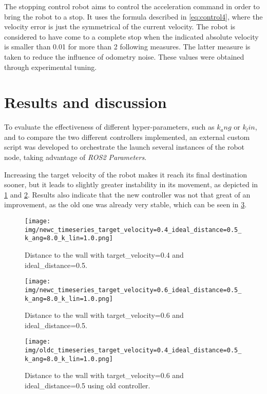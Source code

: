 \documentclass[conference]{IEEEtran}
\begin{document}
The stopping control robot aims to control the acceleration command in order to bring the robot to a stop. It uses the formula described in \ref{eq:control4}, where the velocity error is just the symmetrical of the current velocity. The robot is considered to have come to a complete stop when the indicated absolute velocity is smaller than 0.01 for more than 2 following measures. The latter measure is taken to reduce the influence of odometry noise. These values were obtained through experimental tuning.

\section{Results and discussion} \label{results}

To evaluate the effectiveness of different hyper-parameters, such as \(k_ang\) or \(k_lin\), and to compare the two different controllers implemented, an external custom script was developed to orchestrate the launch several instances of the robot node, taking advantage of \textit{ROS2 Parameters}.

Increasing the target velocity of the robot makes it reach its final destination sooner, but it leads to slightly greater instability in its movement, as depicted in \ref{fig:distance_timeseries_newc1} and \ref{fig:distance_timeseries_newc2}. Results also indicate that the new controller was not that great of an improvement, as the old one was already very stable, which can be seen in \ref{fig:distance_timeseries_oldc}.

\begin{figure}
    \centering
    \texttt{[image: img/newc\_timeseries\_target\_velocity=0.4\_ideal\_distance=0.5\_k\_ang=8.0\_k\_lin=1.0.png]}
    \label{fig:distance_timeseries_newc1}
    \caption{Distance to the wall with target\_velocity=0.4 and ideal\_distance=0.5.}
\end{figure}

\begin{figure}
    \centering
    \texttt{[image: img/newc\_timeseries\_target\_velocity=0.6\_ideal\_distance=0.5\_k\_ang=8.0\_k\_lin=1.0.png]}
    \caption{Distance to the wall with target\_velocity=0.6 and ideal\_distance=0.5.}
    \label{fig:distance_timeseries_newc2}
\end{figure}

\begin{figure}
    \centering
    \texttt{[image: img/oldc\_timeseries\_target\_velocity=0.4\_ideal\_distance=0.5\_k\_ang=8.0\_k\_lin=1.0.png]}
    \caption{Distance to the wall with target\_velocity=0.6 and ideal\_distance=0.5 using old controller.}
    \label{fig:distance_timeseries_oldc}
\end{figure}
\end{document}
